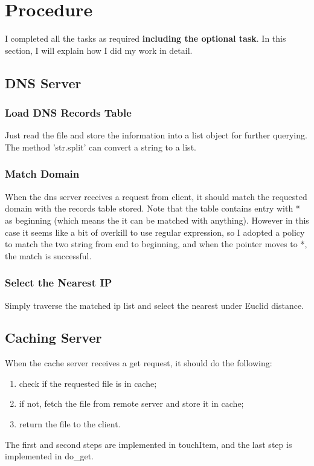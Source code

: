 \documentclass[12pt,a4paper,UTF8]{article}
\begin{document}
\section{Procedure}
I completed all the tasks as required \textbf{including the optional task}.
In this section, I will explain how I did my work in detail.

\subsection{DNS Server}
\subsubsection{Load DNS Records Table}
Just read the file and store the information into a list object for further querying. The method 'str.split' can convert a string to a list.


\subsubsection{Match Domain}
When the dns server receives a request from client, it should match the requested domain with the records table stored.
Note that the table contains entry with * as beginning (which means the it can be matched with anything).
However in this case it seems like a bit of overkill to use regular expression, so I adopted a policy to match the two string from end to beginning, and when the pointer moves to *, the match is successful.


\subsubsection{Select the Nearest IP}
Simply traverse the matched ip list and select the nearest under Euclid distance.


\subsection{Caching Server}
When the cache server receives a get request, it should do the following:
\begin{enumerate}
	\item check if the requested file is in cache;
	\item if not, fetch the file from remote server and store it in cache;
	\item return the file to the client.
\end{enumerate}
The first and second steps are implemented in touchItem, and the last step is implemented in do\_get.
\end{document}
